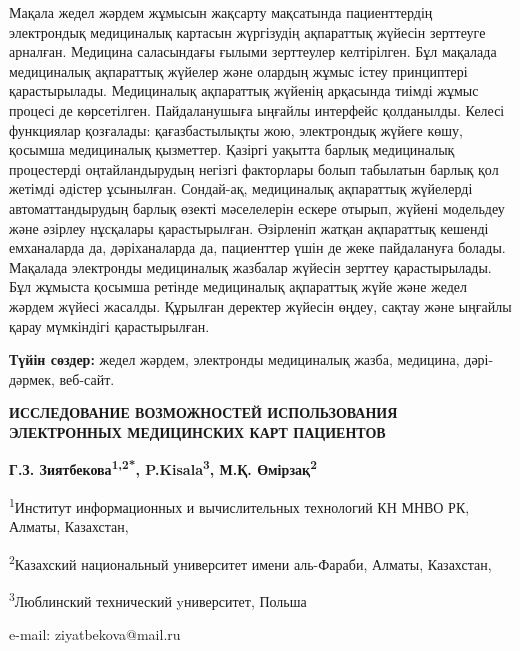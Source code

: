 Мақала жедел жәрдем жұмысын жақсарту мақсатында
пациенттердің электрондық медициналық картасын жүргізудің ақпараттық
жүйесін зерттеуге арналған. Медицина саласындағы ғылыми зерттеулер
келтірілген. Бұл мақалада медициналық ақпараттық жүйелер және олардың
жұмыс істеу принциптері қарастырылады. Медициналық ақпараттық жүйенің
арқасында тиімді жұмыс процесі де көрсетілген. Пайдаланушыға ыңғайлы
интерфейс қолданылды. Келесі функциялар қозғалады: қағазбастылықты жою,
электрондық жүйеге көшу, қосымша медициналық қызметтер. Қазіргі уақытта
барлық медициналық процестерді оңтайландырудың негізгі факторлары болып
табылатын барлық қол жетімді әдістер ұсынылған. Сондай-ақ, медициналық
ақпараттық жүйелерді автоматтандырудың барлық өзекті мәселелерін ескере
отырып, жүйені модельдеу және әзірлеу нұсқалары қарастырылған. Әзірленіп
жатқан ақпараттық кешенді емханаларда да, дәріханаларда да, пациенттер
үшін де жеке пайдалануға болады. Мақалада электронды медициналық
жазбалар жүйесін зерттеу қарастырылады. Бұл жұмыста қосымша ретінде
медициналық ақпараттық жүйе және жедел жәрдем жүйесі жасалды. Құрылған
деректер жүйесін өңдеу, сақтау және ыңғайлы қарау мүмкіндігі
қарастырылған.

{\bfseries Түйін сөздер:} жедел жәрдем, электронды медициналық жазба,
медицина, дәрі-дәрмек, веб-сайт.

\begin{center}
{\large\bfseries ИССЛЕДОВАНИЕ ВОЗМОЖНОСТЕЙ ИСПОЛЬЗОВАНИЯ ЭЛЕКТРОННЫХ МЕДИЦИНСКИХ
КАРТ ПАЦИЕНТОВ}

\vspace{1em}
{\bfseries Г.З. Зиятбекова\textsuperscript{1,2*},
P.Kisala\textsuperscript{3}, М.Қ. Өмірзақ\textsuperscript{2}}

\textsuperscript{1}Институт информационных и вычислительных технологий
КН МНВО РК, Алматы, Казахстан,

\textsuperscript{2}Казахский национальный университет имени аль-Фараби,
Алматы, Казахстан,

\textsuperscript{3}Люблинский технический yниверситет, Польша

e-mail: ziyatbekova@mail.ru
\end{center}

